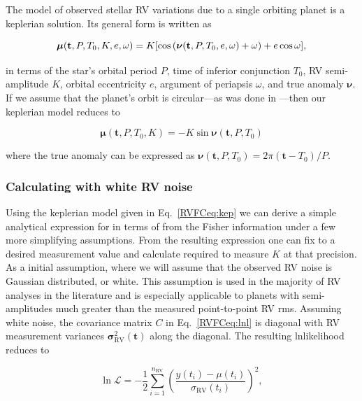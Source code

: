 The model of observed stellar RV variations due to a single orbiting planet is a
keplerian solution. Its general form is written as

\begin{equation}
  \boldsymbol{\mu}(\mathbf{t},P,T_0,K,e,\omega) = K [\cos{(\boldsymbol{\nu}(\mathbf{t},P,T_0,e,\omega)+\omega)} \\
    + e\cos{\omega}],
\end{equation}

\noindent in terms of the star's orbital period $P$, time of inferior conjunction $T_0$,
RV semi-amplitude $K$, orbital eccentricity $e$, argument of periapsis $\omega$, and true anomaly
$\boldsymbol{\nu}$. If we assume that the planet's orbit is circular---as was done in ---then
our keplerian model reduces to

\begin{equation}
  \boldsymbol{\mu}(\mathbf{t},P,T_0,K) = -K \sin{\boldsymbol{\nu}(\mathbf{t},P,T_0)}
  \label{RVFCeq:kep}
\end{equation}

\noindent where the true anomaly can be expressed as $\boldsymbol{\nu}(\mathbf{t},P,T_0) =2\pi(\mathbf{t}-T_0)/P$.

\subsubsection{Calculating \sigK{} with white RV noise} \label{RVFCsect:fisherwhite}
Using the keplerian model given in Eq.~\ref{RVFCeq:kep} we can derive a simple analytical expression for
\sigK{} in terms of \nrv{} from the Fisher information under a few more simplifying assumptions. 
From the resulting expression one can fix \sigK{} to a desired measurement value and calculate \nrv{}
required to measure $K$ at that precision. As a initial assumption, where we will assume that the observed
RV noise is Gaussian distributed, or white.
This assumption is used in the majority of RV analyses in the literature and
is especially applicable to planets with semi-amplitudes much greater than the measured point-to-point RV rms.
Assuming white noise, the covariance matrix $C$ in Eq.~\ref{RVFCeq:lnl} is diagonal with RV measurement variances
$\boldsymbol{\sigma}_{\text{RV}}^2(\mathbf{t})$ along the diagonal. The resulting lnlikelihood reduces to

\begin{equation}
  \ln{\mathcal{L}} = -\frac{1}{2} \sum^{n_{\text{RV}}}_{i=1} \left( \frac{y(t_i)-\mu(t_i)}{\sigma_{\text{RV}}(t_i)} \right)^2,
  \label{RVFCeq:lnl2}
\end{equation}

